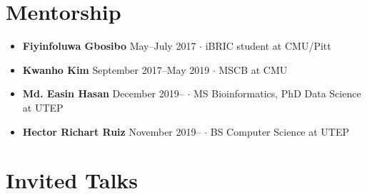 \documentclass[10pt,letterpaper]{article}
\newcommand{\bigdot}{$\cdot$\xspace}
\begin{document}
\section*{Mentorship}
\begin{itemize}[leftmargin=*,labelindent=5pt,itemindent=-15pt]
\item \textbf{Fiyinfoluwa Gbosibo} May--July 2017 \bigdot iBRIC student at CMU/Pitt
\item \textbf{Kwanho Kim} September 2017--May 2019 \bigdot MSCB at CMU
\item \textbf{Md. Easin Hasan} December 2019-- \bigdot MS Bioinformatics, PhD Data Science at UTEP
\item \textbf{Hector Richart Ruiz} November 2019-- \bigdot BS Computer Science at UTEP
\end{itemize}








\section*{Invited Talks}
\end{document}
